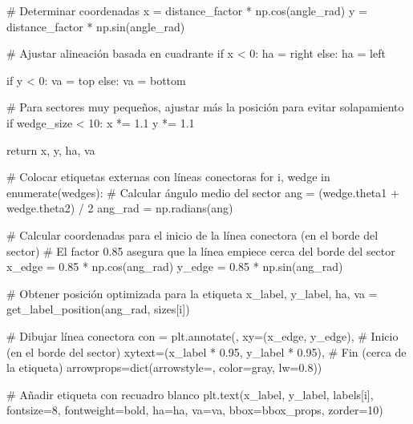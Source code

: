 \documentclass[
]{article}
\newenvironment{Shaded}{\begin{snugshade}}{\end{snugshade}}
\newcommand{\StringTok}[1]{\textcolor[rgb]{0.31,0.60,0.02}{#1}}
\begin{document}
\begin{Shaded}
\begin{Highlighting}[]
\StringTok{    \# Determinar coordenadas}
\StringTok{    x = distance\_factor * np.cos(angle\_rad)}
\StringTok{    y = distance\_factor * np.sin(angle\_rad)}

\StringTok{    \# Ajustar alineación basada en cuadrante}
\StringTok{    if x \textless{} 0:}
\StringTok{        ha = \textquotesingle{}right\textquotesingle{}}
\StringTok{    else:}
\StringTok{        ha = \textquotesingle{}left\textquotesingle{}}

\StringTok{    if y \textless{} 0:}
\StringTok{        va = \textquotesingle{}top\textquotesingle{}}
\StringTok{    else:}
\StringTok{        va = \textquotesingle{}bottom\textquotesingle{}}

\StringTok{    \# Para sectores muy pequeños, ajustar más la posición para evitar solapamiento}
\StringTok{    if wedge\_size \textless{} 10:}
\StringTok{        x *= 1.1}
\StringTok{        y *= 1.1}

\StringTok{    return x, y, ha, va}

\StringTok{\# Colocar etiquetas externas con líneas conectoras}
\StringTok{for i, wedge in enumerate(wedges):}
\StringTok{    \# Calcular ángulo medio del sector}
\StringTok{    ang = (wedge.theta1 + wedge.theta2) / 2}
\StringTok{    ang\_rad = np.radians(ang)}

\StringTok{    \# Calcular coordenadas para el inicio de la línea conectora (en el borde del sector)}
\StringTok{    \# El factor 0.85 asegura que la línea empiece cerca del borde del sector}
\StringTok{    x\_edge = 0.85 * np.cos(ang\_rad)}
\StringTok{    y\_edge = 0.85 * np.sin(ang\_rad)}

\StringTok{    \# Obtener posición optimizada para la etiqueta}
\StringTok{    x\_label, y\_label, ha, va = get\_label\_position(ang\_rad, sizes[i])}

\StringTok{    \# Dibujar línea conectora}
\StringTok{    con = plt.annotate(\textquotesingle{}\textquotesingle{},}
\StringTok{                      xy=(x\_edge, y\_edge),  \# Inicio (en el borde del sector)}
\StringTok{                      xytext=(x\_label * 0.95, y\_label * 0.95),  \# Fin (cerca de la etiqueta)}
\StringTok{                      arrowprops=dict(arrowstyle=\textquotesingle{}{-}\textquotesingle{}, color=\textquotesingle{}gray\textquotesingle{}, lw=0.8))}

\StringTok{    \# Añadir etiqueta con recuadro blanco}
\StringTok{    plt.text(x\_label, y\_label, labels[i],}
\StringTok{            fontsize=8,}
\StringTok{            fontweight=\textquotesingle{}bold\textquotesingle{},}
\StringTok{            ha=ha,}
\StringTok{            va=va,}
\StringTok{            bbox=bbox\_props,}
\StringTok{            zorder=10)}


\end{Highlighting}
\end{Shaded}
\end{document}
